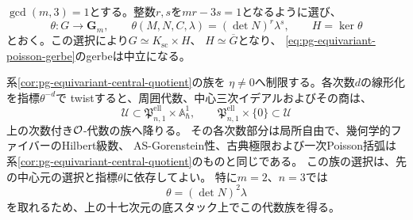 \begin{corollary}[指標による次数線形化の降下]
\label{cor:pg-equivariant-character-descent}
$\gcd(m,3)=1$とする。整数$r,s$を$mr-3s=1$となるように選び、
\begin{equation}
 \theta:G\longrightarrow\mathbf G_m,
 \qquad \theta(M,N,C,\lambda)=(\det N)^r\lambda^s,
 \qquad H=\ker\theta
 \label{eq:pg-equivariant-scalar-character}
\end{equation}
とおく。この選択により$G\simeq K_{\mathrm{sc}}\times H$、
$H\simeq\overline G$となり、
\eqref{eq:pg-equivariant-poisson-gerbe}のgerbeは中立になる。

系\ref{cor:pg-equivariant-central-quotient}の族を
$\eta\ne0$へ制限する。各次数$d$の線形化を指標$\theta^{-d}$で
twistすると、周囲代数、中心三次イデアルおよびその商は、
\begin{equation}
 \mathcal U\subset
 \mathfrak P_{n,1}^{\mathrm{ell}}\times\mathbb A^1_\hbar,
 \qquad
 \mathfrak P_{n,1}^{\mathrm{ell}}\times\{0\}\subset\mathcal U
 \label{eq:pg-equivariant-rigidified-family-base}
\end{equation}
上の次数付き$\mathcal O$-代数の族へ降りる。
その各次数部分は局所自由で、幾何学的ファイバーのHilbert級数、
AS-Gorenstein性、古典極限および一次Poisson括弧は
系\ref{cor:pg-equivariant-central-quotient}のものと同じである。
この族の選択は、先の中心元の選択と指標$\theta$に依存してよい。
特に$m=2$、$n=3$では
\begin{equation}
 \theta=(\det N)^2\lambda
 \label{eq:pg-equivariant-threefold-character}
\end{equation}
を取れるため、上の十七次元の底スタック上でこの代数族を得る。
\end{corollary}

